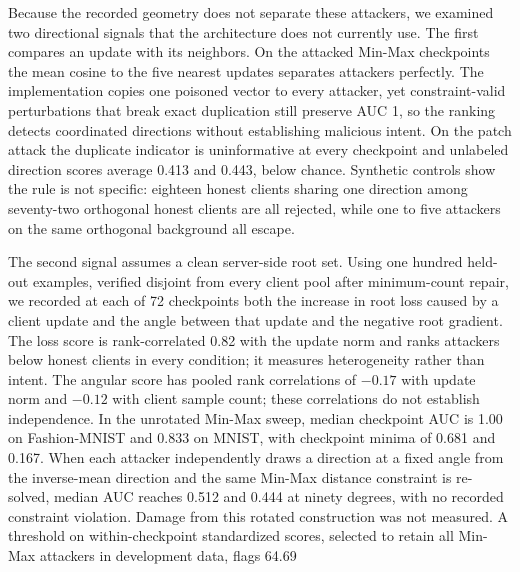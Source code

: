 \documentclass[journal]{IEEEtran}
\begin{document}
Because the recorded geometry does not separate these attackers, we examined two directional signals that the architecture does not currently use. The first compares an update with its neighbors. On the attacked Min-Max checkpoints the mean cosine to the five nearest updates separates attackers perfectly. The implementation copies one poisoned vector to every attacker, yet constraint-valid perturbations that break exact duplication still preserve AUC 1, so the ranking detects coordinated directions without establishing malicious intent. On the patch attack the duplicate indicator is uninformative at every checkpoint and unlabeled direction scores average 0.413 and 0.443, below chance. Synthetic controls show the rule is not specific: eighteen honest clients sharing one direction among seventy-two orthogonal honest clients are all rejected, while one to five attackers on the same orthogonal background all escape.

The second signal assumes a clean server-side root set. Using one hundred held-out examples, verified disjoint from every client pool after minimum-count repair, we recorded at each of 72 checkpoints both the increase in root loss caused by a client update and the angle between that update and the negative root gradient. The loss score is rank-correlated 0.82 with the update norm and ranks attackers below honest clients in every condition; it measures heterogeneity rather than intent. The angular score has pooled rank correlations of $-0.17$ with update norm and $-0.12$ with client sample count; these correlations do not establish independence. In the unrotated Min-Max sweep, median checkpoint AUC is 1.00 on Fashion-MNIST and 0.833 on MNIST, with checkpoint minima of 0.681 and 0.167. When each attacker independently draws a direction at a fixed angle from the inverse-mean direction and the same Min-Max distance constraint is re-solved, median AUC reaches 0.512 and 0.444 at ninety degrees, with no recorded constraint violation. Damage from this rotated construction was not measured. A threshold on within-checkpoint standardized scores, selected to retain all Min-Max attackers in development data, flags 64.69%
\end{document}
